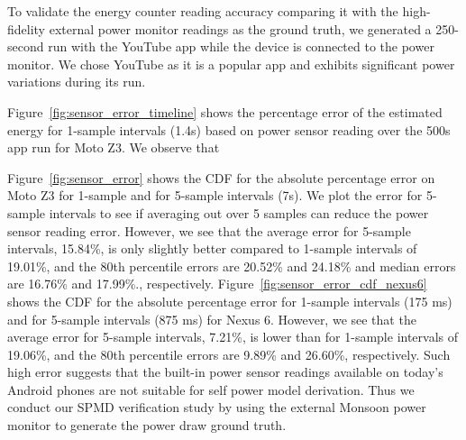  
To validate the energy counter reading accuracy comparing it with the high-fidelity 
external power monitor readings as the ground truth,
we generated a 250-second run with the YouTube app while the device is connected to the power monitor.
We chose YouTube as it is a popular app and exhibits significant power variations during its run.

Figure~\ref{fig:sensor_error_timeline} shows the percentage error of the estimated energy
for 1-sample intervals (1.4s) based on power sensor reading over the 500s app run for Moto Z3.
We observe that 
\fi

Figure~\ref{fig:sensor_error} shows the CDF for the absolute percentage error on Moto Z3
for 1-sample and for 5-sample intervals (7s). 
We plot the error for 5-sample intervals to see if averaging out over 5 samples can reduce the 
power sensor reading error.
However, we see that the average error for 5-sample intervals, 15.84\%,
is only slightly better compared to 1-sample intervals of 19.01\%, and
the 80th percentile errors are 20.52\% and 24.18\% and median errors are 
16.76\% and 17.99\%., respectively.
Figure~\ref{fig:sensor_error_cdf_nexus6} shows the CDF for the absolute percentage error
for 1-sample intervals (175 ms) and for 5-sample intervals (875 ms) for Nexus 6.
However, we see that the average error for 5-sample intervals, 7.21\%,
is lower than for 1-sample intervals of 19.06\%, and
the 80th percentile errors are 9.89\% and 26.60\%, respectively.
\fi
Such high error suggests that the built-in power sensor readings available on today's Android phones 
are not suitable for self power model derivation. 
Thus we conduct our SPMD verification study by using the external Monsoon power monitor to generate the 
power draw ground truth. 

